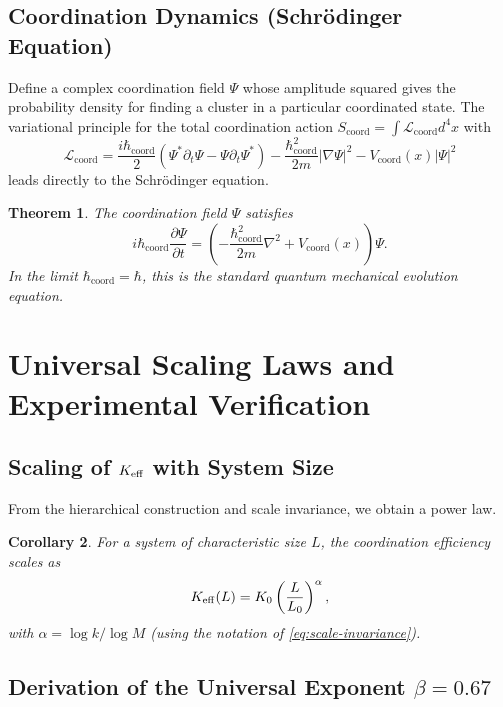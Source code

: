 \documentclass[12pt,a4paper]{article}
\newtheorem{theorem}{Theorem}[section]
\newtheorem{corollary}[theorem]{Corollary}
\newcommand{\Keff}[1][]{K_{\mathrm{eff}\if\relax\detokenize{#1}\relax\else,#1\fi}}   %
\newcommand{\coord}{\mathrm{coord}}
\newcommand{\hcoord}{\hbar_{\mathrm{coord}}}
\newcommand{\cL}{\mathcal{L}}
\begin{document}
	\subsection{Coordination Dynamics (Schrödinger Equation)}
	
	Define a complex coordination field $\Psi$ whose amplitude squared gives the probability density for finding a cluster in a particular coordinated state. The variational principle for the total coordination action $S_{\coord} = \int \cL_{\coord} d^4x$ with
	\begin{equation}
		\cL_{\coord} = \frac{i\hcoord}{2}\left( \Psi^* \partial_t \Psi - \Psi \partial_t \Psi^* \right) - \frac{\hcoord^2}{2m} |\nabla \Psi|^2 - V_{\coord}(x) |\Psi|^2
	\end{equation}
	leads directly to the Schrödinger equation.
	
	\begin{theorem}
		The coordination field $\Psi$ satisfies
		\begin{equation}
			i \hcoord \frac{\partial \Psi}{\partial t} = \left( -\frac{\hcoord^2}{2m} \nabla^2 + V_{\coord}(x) \right) \Psi.
			\label{eq:schrodinger}
		\end{equation}
		In the limit $\hcoord = \hbar$, this is the standard quantum mechanical evolution equation.
	\end{theorem}
	
	\section{Universal Scaling Laws and Experimental Verification}
	
	\subsection{Scaling of \(\Keff\) with System Size}
	From the hierarchical construction and scale invariance, we obtain a power law.
	
	\begin{corollary}
		For a system of characteristic size $L$, the coordination efficiency scales as
		\begin{equation}
			\Keff(L) = K_0 \left( \frac{L}{L_0} \right)^{\alpha},
			\label{eq:scaling-law}
		\end{equation}
		with $\alpha = \log k / \log M$ (using the notation of \eqref{eq:scale-invariance}).
	\end{corollary}
	
	\subsection{Derivation of the Universal Exponent \(\beta = 0.67\)}
	\label{sec:beta-derivation}
	
\end{document}
